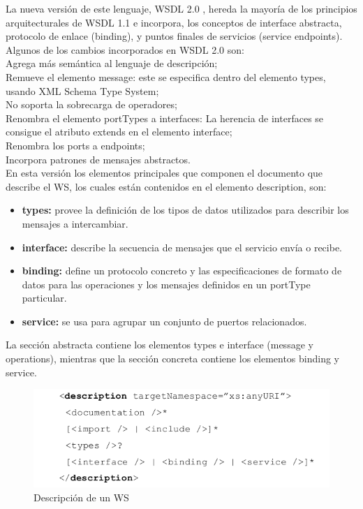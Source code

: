 La nueva versión de este lenguaje, WSDL 2.0 \cite{WSDL2.0-0}, hereda la mayoría de los principios arquitecturales de WSDL 1.1 e incorpora, los conceptos de interface abstracta, protocolo de enlace (binding), y puntos finales de servicios (service endpoints). Algunos de los cambios incorporados en WSDL 2.0 son:\\
Agrega más semántica al lenguaje de descripción;\\
Remueve el elemento message: este se especifica dentro del elemento types, usando XML Schema Type System;\\
No soporta la sobrecarga de operadores;\\

Renombra el elemento portTypes a interfaces: La herencia de interfaces se consigue el atributo extends en el elemento interface;\\
Renombra los ports a endpoints;\\
Incorpora patrones de mensajes abstractos.\\

En esta versión los elementos principales que componen el documento que describe el WS, los cuales están contenidos en el elemento description, son: \\
\begin{itemize}
	\item \textbf{types:} provee la definición de los tipos de datos utilizados para describir los mensajes a intercambiar.
	\item \textbf{interface:} describe la secuencia de mensajes que el servicio envía o recibe.
	\item \textbf{binding:} define un protocolo concreto y las especificaciones de formato de datos para las operaciones y los mensajes definidos en un portType particular.
	\item \textbf{service:} se usa para agrupar un conjunto de puertos relacionados.
\end{itemize}

La sección abstracta contiene los elementos types e interface (message y operations), mientras que la sección concreta contiene los elementos binding y service.

\begin{figure}[!h] 
	\begin{center}
		\includegraphics [scale=0.70]{imagenes/descripcion_ws.png}
	\end{center}
	\caption{Descripción de un WS}
	\label{fig:Descripción de un WS}
\end{figure} 

